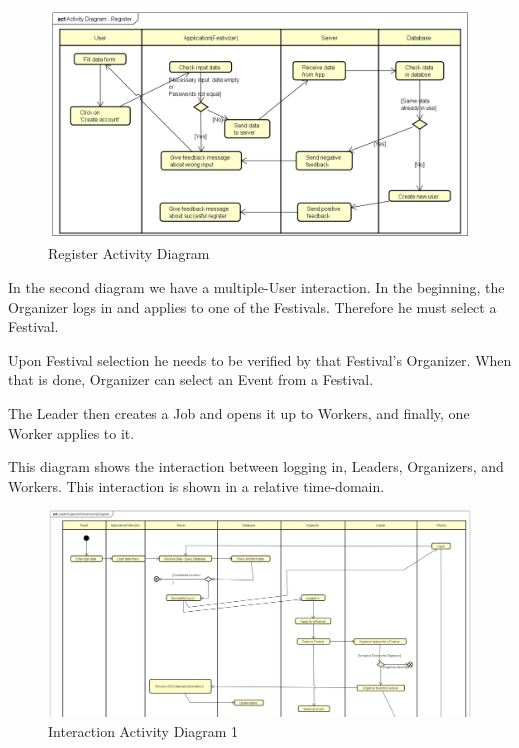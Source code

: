 \begin{figure}[H]
	\includegraphics[width=\linewidth]{diagrams/Activity Diagram - Register.png}
	\caption{Register Activity Diagram}
	\label{fig:register_activity_diag}
\end{figure}

In the second diagram we have a multiple-User interaction. In the beginning, the Organizer logs in and applies to one of the Festivals. Therefore he must select a Festival.

Upon Festival selection he needs to be verified by that Festival's Organizer. When that is done, Organizer can select an Event from a Festival.

The Leader then creates a Job and opens it up to Workers, and finally, one Worker applies to it.

This diagram shows the interaction between logging in, Leaders, Organizers, and Workers. This interaction is shown in a relative time-domain.

\begin{figure}[H]
	\includegraphics[width=\linewidth]{diagrams/Interaction_Activity_Diag_1.png}
	\caption{Interaction Activity Diagram 1}
	\label{fig:interaction_activity_diag_1}
\end{figure}

